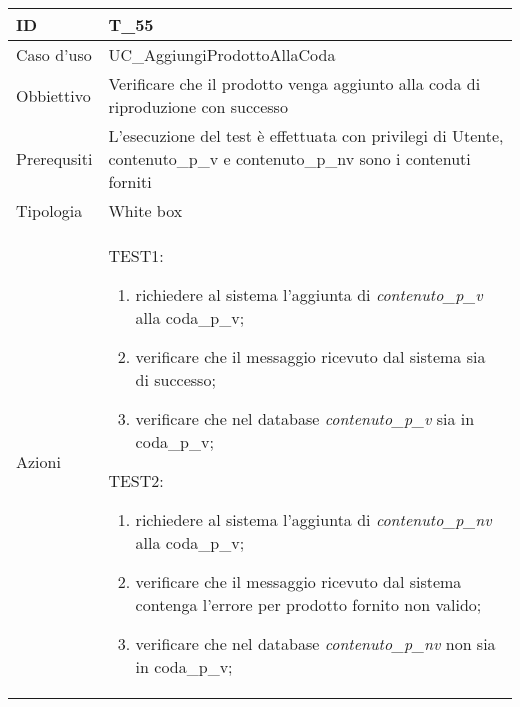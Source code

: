\begin{table}[hb]
    \centering
    \begin{tabular}{ |p{2cm}|p{10cm}|  }
        \hline
        ID          & T\_55                                                                 \\\hline
        Caso d'uso  & UC\_AggiungiProdottoAllaCoda                                                    \\\hline
        Obbiettivo  & Verificare che il prodotto venga aggiunto alla coda di riproduzione con successo \\\hline
        Prerequsiti & L'esecuzione del test è effettuata con privilegi di Utente, contenuto\_p\_v
        e contenuto\_p\_nv sono i contenuti forniti           \\\hline
        Tipologia   & White box                                                             \\\hline
        Azioni      &
        TEST1:
        \begin{enumerate}[nosep, topsep=0pt]
            \item richiedere al sistema l'aggiunta di \emph{contenuto\_p\_v} alla coda\_p\_v;
            \item verificare che il messaggio ricevuto dal sistema sia di successo;
            \item verificare che nel database \emph{contenuto\_p\_v} sia in coda\_p\_v;
        \end{enumerate}
        \vspace{0.5cm} TEST2:
        \begin{enumerate}[nosep, topsep=0pt]
            \item richiedere al sistema l'aggiunta di \emph{contenuto\_p\_nv} alla coda\_p\_v;
            \item verificare che il messaggio ricevuto dal sistema contenga l'errore per
            prodotto fornito non valido;
            \item verificare che nel database \emph{contenuto\_p\_nv} non sia in coda\_p\_v;
        \end{enumerate}
        \\\hline
    \end{tabular}
\end{table}

